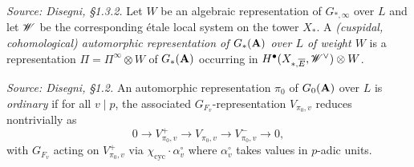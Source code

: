 \begin{definition}
  \label{def:AutomorphicRepresentation}
  \textit{Source: Disegni, §1.3.2.}
  Let $W$ be an algebraic representation of $G_{*,\infty}$ over $L$ and
  let $\mathscr{W}$ be the corresponding \'{e}tale local system on the tower
  $X_*$.  A \emph{(cuspidal, cohomological) automorphic representation
  of $G_*(\mathbf{A})$ over $L$ of weight $W$} is a representation
  $\Pi = \Pi^\infty \otimes W$ of $G_*(\mathbf{A})$ occurring in
  $H^\bullet(X_{*,\overline{E}}, \mathscr{W}^\vee) \otimes W$.
\end{definition}

\begin{definition}
  \label{def:OrdinaryAutomorphicRep}
  \textit{Source: Disegni, §1.2.}
  An automorphic representation $\pi_0$ of $G_0(\mathbf{A})$ over $L$ is
  \emph{ordinary} if for all $v \mid p$, the associated
  $G_{F_v}$-representation $V_{\pi_0,v}$ reduces nontrivially as
  \[
    0 \to V_{\pi_0,v}^+ \to V_{\pi_0,v} \to V_{\pi_0,v}^- \to 0,
  \]
  with $G_{F_v}$ acting on $V_{\pi_0,v}^+$ via $\chi_{\mathrm{cyc}}
  \cdot \alpha_v^\circ$ where $\alpha_v^\circ$ takes values in
  $p$-adic units.
\end{definition}

